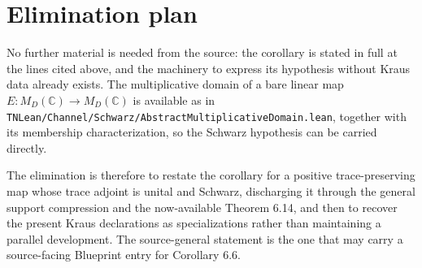 \documentclass[11pt]{article}
\begin{document}
\section{Elimination plan}

No further material is needed from the source: the corollary is stated in full at the
lines cited above, and the machinery to express its hypothesis without Kraus data already
exists. The multiplicative domain of a bare linear map
$E : M_D(\mathbb{C}) \to M_D(\mathbb{C})$ is available as  in
\texttt{TNLean/Channel/Schwarz/AbstractMultiplicativeDomain.lean}, together with its
membership characterization, so the Schwarz hypothesis can be carried directly.

The elimination is therefore to restate the corollary for a positive trace-preserving map
whose trace adjoint is unital and Schwarz, discharging it through the general support
compression and the now-available Theorem 6.14, and then to recover the present Kraus
declarations as specializations rather than maintaining a parallel development. The
source-general statement is the one that may carry a source-facing Blueprint entry for
Corollary 6.6.
\end{document}
